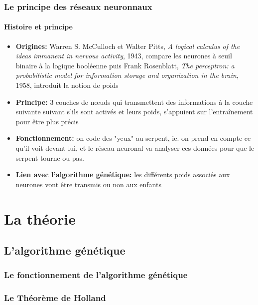 \documentclass[10pt]{beamer}
\begin{document}
\begin{frame}

  \frametitle{Le principe des réseaux neuronnaux}
  \framesubtitle{Histoire et principe}
  
  \begin{itemize}
    
    \item \textbf{Origines:} Warren S. McCulloch et Walter Pitts, \textit{A logical calculus of the ideas immanent in nervous activity}, 1943, compare les neurones à seuil binaire à la logique booléenne puis Frank Rosenblatt, \textit{The perceptron: a probabilistic model for information storage and organization in the brain}, 1958, introduit la notion de poids
    
    \item \textbf{Principe:} 3 couches de n\oe uds qui transmettent des informations à la couche suivante suivant s'ils sont activés et leurs poids, s'appuient sur l'entraînement pour être plus précis
    
    \item \textbf{Fonctionnement:} on code des "yeux" au serpent, ie. on prend en compte ce qu'il voit devant lui, et le réseau neuronal va analyser ces données pour que le serpent tourne ou pas.
    
    \item \textbf{Lien avec l'algorithme génétique:} les différents poids associés aux neurones vont être transmis ou non aux enfants

  \end{itemize}

  \end{frame}

  \section{La théorie}


  \subsection{L'algorithme génétique}
  
  \begin{frame}
    \frametitle{Le fonctionnement de l'algorithme génétique}
  \end{frame}
  
  \begin{frame}
    \frametitle{Le Théorème de Holland}
  \end{frame}
  
\end{document}
